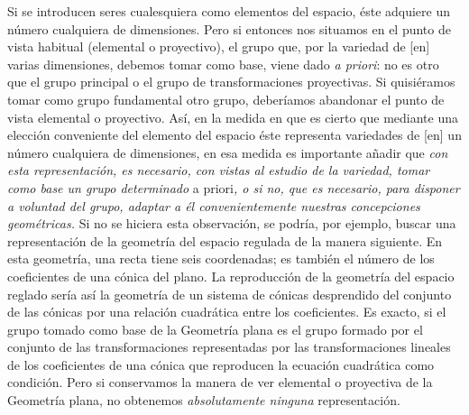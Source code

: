 \documentclass[a4paper, 12pt]{article}
\begin{document}
Si se introducen seres cualesquiera como elementos del espacio, éste adquiere un número cualquiera de dimensiones. Pero si entonces nos situamos en el punto de vista habitual (elemental o proyectivo), el grupo que, por la variedad de [en] varias dimensiones, debemos tomar como base, viene dado \textit{a priori}: no es otro que el grupo principal o el grupo de transformaciones proyectivas. Si quisiéramos tomar como grupo fundamental otro grupo, deberíamos abandonar el punto de vista elemental o proyectivo. Así, en la medida en que es cierto que mediante una elección conveniente del elemento del espacio éste representa variedades de [en] un número cualquiera de dimensiones, en esa medida es importante añadir que \textit{con esta representación, es necesario, con vistas al estudio de la variedad, tomar como base un grupo determinado }a priori\textit{, o si no, que es necesario, para disponer a voluntad del grupo, adaptar a él convenientemente nuestras concepciones geométricas. }Si no se hiciera esta observación, se podría, por ejemplo, buscar una representación de la geometría del espacio regulada de la manera siguiente. En esta geometría, una recta tiene seis coordenadas; es también el número de los coeficientes de una cónica del plano. La reproducción de la geometría del espacio reglado sería así la geometría de un sistema de cónicas desprendido del conjunto de las cónicas por una relación cuadrática entre los coeficientes. Es exacto, si el grupo tomado como base de la Geometría plana es el grupo formado por el conjunto de las transformaciones representadas por las transformaciones lineales de los coeficientes de una cónica que reproducen la ecuación cuadrática como condición. Pero si conservamos la manera de ver elemental o proyectiva de la Geometría plana, no obtenemos \textit{absolutamente ninguna} representación.
\end{document}
